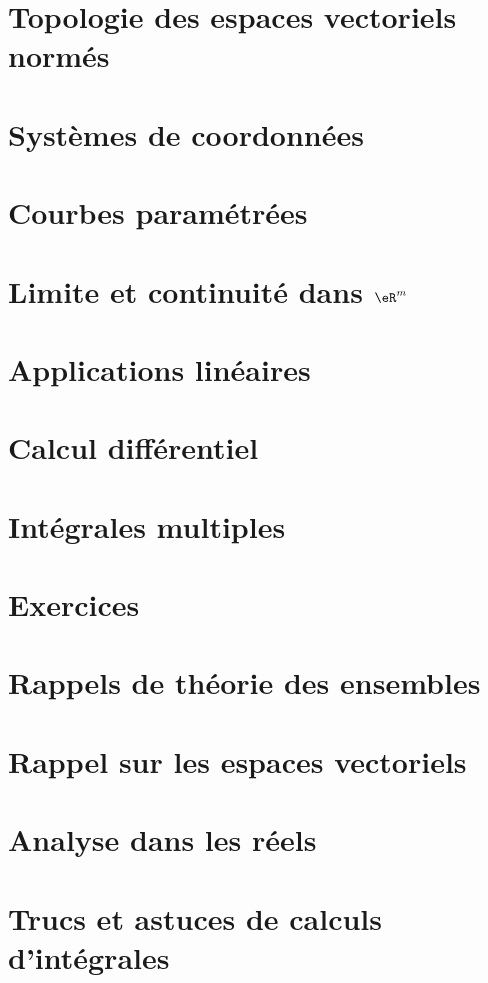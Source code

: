 
\chapter{Topologie des espaces vectoriels normés}      \label{ChapEspVectNorm}


\chapter{Systèmes de coordonnées}


\chapter{Courbes paramétrées}           \label{Chap_courbes}


\chapter{Limite et continuité dans $\eR^m$} \label{ChapLimContinuite}


\chapter{Applications linéaires}        \label{Chap_appl_lin}


\chapter{Calcul différentiel}           \label{ChapCalculDiff}


\chapter{Intégrales multiples}          \label{ChapMultiples}



\chapter{Exercices}             \label{Chap_exercices}


\chapter{Rappels de théorie des ensembles}


\chapter{Rappel sur les espaces vectoriels}    \label{AppendiceEspVectoriels}


\chapter{Analyse dans les réels}        \label{AppendiceAnalyseR}


\chapter{Trucs et astuces de calculs d'intégrales}

